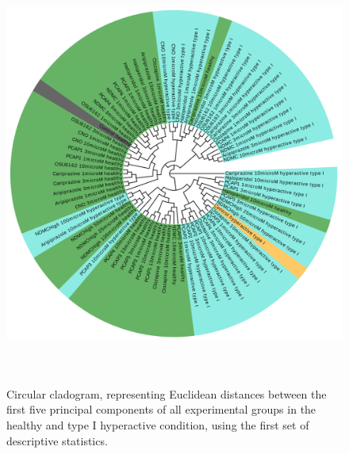 \documentclass[a4paper,12pt]{article}
\begin{document}
\begin{figure}[h!]
\begin{center}
\includegraphics[width=14cm,height=14cm]{DarkApoHigh_set1_PCA_tree_A.png}
\caption{Circular cladogram, representing Euclidean distances between the first five principal components of all experimental groups in the healthy and type I hyperactive condition, using the first set of descriptive statistics.}
\end{center}
\end{figure}
\newpage
\end{document}
